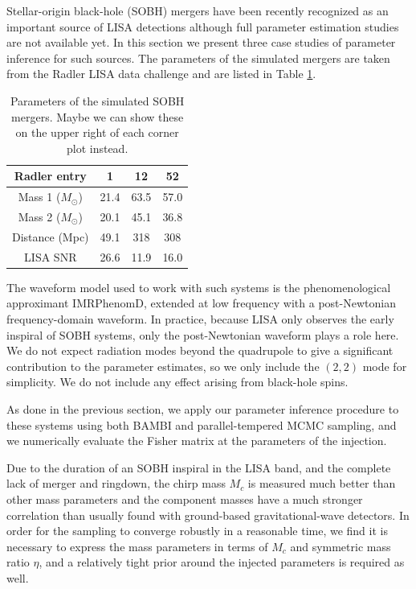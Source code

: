 \documentclass[aps,showpacs,twocolumn,prd,superscriptaddress,nofootinbib]{revtex4-1}
\newcommand{\Msol}{M_{\odot}}
\newcommand{\Mchirp}{M_{c}}
\newcommand{\tdc}[1]{{\color{red} #1}}
\begin{document}
Stellar-origin black-hole (SOBH) mergers have been recently recognized as an
important source of LISA detections \cite{Sesana16} although full parameter
estimation studies are not available yet. In this section we present
three case studies of parameter inference for such sources. The parameters of
the simulated mergers are taken from the Radler LISA data challenge and are
listed in Table \ref{table:sobh_params}.
\begin{table}
	\begin{tabular}{|c||c|c|c|}
		\hline
		Radler entry 		& 1 	& 12 	& 52 \\
		\hline
		Mass 1 ($\Msol$) 	& 21.4	& 63.5	& 57.0 \\
		\hline
		Mass 2 ($\Msol$) 	& 20.1	& 45.1	& 36.8 \\
		\hline
		Distance (Mpc) 		& 49.1	& 318	& 308 \\
		\hline
		LISA SNR 			& 26.6	& 11.9	& 16.0 \\
		\hline
	\end{tabular}
	\caption{Parameters of the simulated SOBH mergers. \tdc{Maybe we can show
			 these on the upper right of each corner plot instead.}}
	\label{table:sobh_params}
\end{table}

The waveform model used to work with such systems is the phenomenological
approximant IMRPhenomD, extended at low frequency with a post-Newtonian
frequency-domain waveform. In practice, because LISA only observes the early
inspiral of SOBH systems, only the post-Newtonian waveform plays a role here.
We do not expect radiation modes beyond the quadrupole to give a significant
contribution to the parameter estimates, so we only include the $(2,2)$ mode
for simplicity. We do not include any effect arising from black-hole spins.

As done in the previous section, we apply our parameter inference procedure to
these systems using both BAMBI and parallel-tempered MCMC sampling, and we
numerically evaluate the Fisher matrix at the parameters of the injection.

Due to the duration of an SOBH inspiral in the LISA band, and the complete lack
of merger and ringdown, the chirp mass $\Mchirp$ is measured much better than
other mass parameters and the component masses have a much stronger correlation
than usually found with ground-based gravitational-wave detectors. In order for
the sampling to converge robustly in a reasonable time, we find it is necessary
to express the mass parameters in terms of $\Mchirp$ and symmetric mass ratio
$\eta$, and a relatively tight prior around the injected parameters is required
as well.
\end{document}
